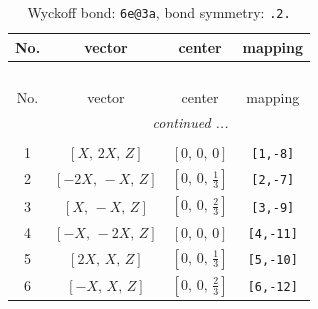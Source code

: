 \documentclass[fleqn,8pt]{jsarticle}
\begin{document}
\renewcommand{\arraystretch}{1.2}
\begin{longtable}{cccc}
\caption{Wyckoff bond: {\tt 6e@3a}, bond symmetry: {\tt .2.}}
 \\
 \hline \hline
No. & vector & center & mapping \\ \hline \endfirsthead

\multicolumn{3}{l}{\tablename\ \thetable{}} \\
 \hline \hline
No. & vector & center & mapping \\ \hline \endhead

 \hline \hline
\multicolumn{3}{r}{\footnotesize\it continued ...} \\ \endfoot

 \hline \hline
\multicolumn{3}{r}{} \\ \endlastfoot

1 & $\left[ X,\, 2 X,\, Z \right]$ & $\left[ 0,\, 0,\, 0 \right]$ & {\tt [1,-8]} \\ \hline
2 & $\left[ - 2 X,\, - X,\, Z \right]$ & $\left[ 0,\, 0,\, \frac{1}{3} \right]$ & {\tt [2,-7]} \\ \hline
3 & $\left[ X,\, - X,\, Z \right]$ & $\left[ 0,\, 0,\, \frac{2}{3} \right]$ & {\tt [3,-9]} \\ \hline
4 & $\left[ - X,\, - 2 X,\, Z \right]$ & $\left[ 0,\, 0,\, 0 \right]$ & {\tt [4,-11]} \\ \hline
5 & $\left[ 2 X,\, X,\, Z \right]$ & $\left[ 0,\, 0,\, \frac{1}{3} \right]$ & {\tt [5,-10]} \\ \hline
6 & $\left[ - X,\, X,\, Z \right]$ & $\left[ 0,\, 0,\, \frac{2}{3} \right]$ & {\tt [6,-12]} \\
\end{longtable}
\renewcommand{\arraystretch}{1.2}
\end{document}

